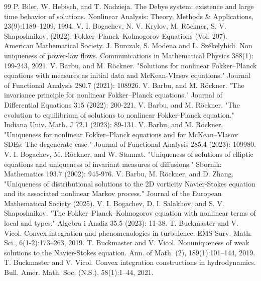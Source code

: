 \documentclass[UTF-8,reqno]{amsart}
\numberwithin{equation}{section}
\theoremstyle{definition}
\begin{document}
\begin{thebibliography}{99}
P. Biler, W. Hebisch, and T. Nadzieja. The Debye system: existence and large time behavior
of solutions. Nonlinear Analysis: Theory, Methods \& Applications, 23(9):1189–1209, 1994.
V. I. Bogachev,  N. V. Krylov, M. R\"ockner,  S. V. Shaposhnikov,  (2022). Fokker–Planck–Kolmogorov Equations (Vol. 207). American Mathematical Society.
J. Burczak, S. Modena and L. Sz\'ekelyhidi. Non uniqueness of power-law flows. Communications in Mathematical Physics 388(1): 199-243, 2021.
V. Barbu, and M. R\"ockner. "Solutions for nonlinear Fokker–Planck equations with measures as initial data and McKean-Vlasov equations." Journal of Functional Analysis 280.7 (2021): 108926.
V. Barbu, and M. R\"ockner. "The invariance principle for nonlinear Fokker–Planck equations." Journal of Differential Equations 315 (2022): 200-221.
V. Barbu, and M. R\"ockner. "The evolution to equilibrium of solutions to nonlinear Fokker-Planck equation." Indiana Univ. Math. J 72.1 (2023): 89-131.
V. Barbu, and M. R\"ockner. "Uniqueness for nonlinear Fokker–Planck equations and for McKean–Vlasov SDEs: The degenerate case." Journal of Functional Analysis 285.4 (2023): 109980.
 V. I. Bogachev, M. R\"ockner, and W. Stannat. "Uniqueness of solutions of elliptic equations and uniqueness of invariant measures of diffusions." Sbornik: Mathematics 193.7 (2002): 945-976.
 V. Barbu, M. R\"ockner, and D. Zhang. "Uniqueness of distributional solutions to the 2D vorticity Navier-Stokes equation and its associated nonlinear Markov process." Journal of the European Mathematical Society (2025).
 V. I. Bogachev, D. I.  Salakhov, and S. V. Shaposhnikov. "The Fokker–Planck–Kolmogorov equation with nonlinear terms of local and types." Algebra i Analiz 35.5 (2023): 11-38.
T. Buckmaster and V. Vicol.
\newblock Convex integration and phenomenologies in turbulence.
\newblock  EMS Surv. Math. Sci., 6(1-2):173--263, 2019.
T. Buckmaster and V. Vicol. Nonuniqueness of weak solutions to the Navier-Stokes equation. Ann. of Math. (2), 189(1):101–144, 2019.
T. Buckmaster and V. Vicol. Convex integration constructions in hydrodynamics. Bull. Amer.
Math. Soc. (N.S.), 58(1):1–44, 2021.


\end{thebibliography}
\end{document}
